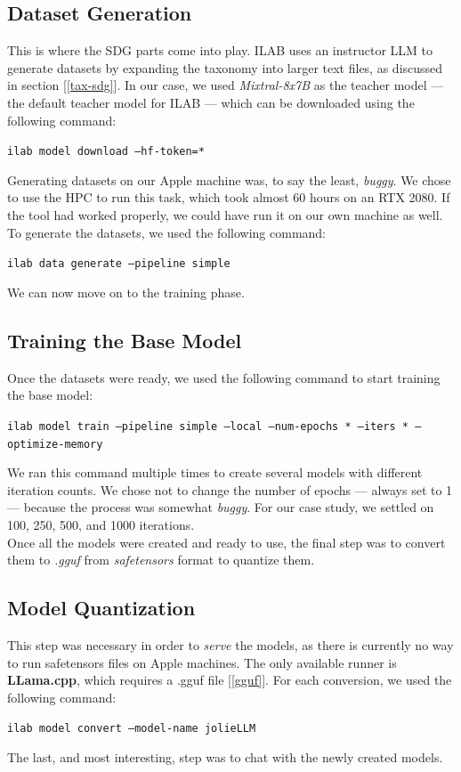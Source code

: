 \documentclass[12pt]{article}
\begin{document}
\subsection{Dataset Generation}
This is where the SDG parts come into play. ILAB uses an instructor LLM to generate datasets by expanding the taxonomy into larger text files, as discussed in section [\ref{tax-sdg}]. In our case, we used \textit{Mixtral-8x7B} as the teacher model — the default teacher model for ILAB — which can be downloaded using the following command:
\begin{center}
    \texttt{ilab model download --hf-token=*}
\end{center}
Generating datasets on our Apple machine was, to say the least, \textit{buggy}. We chose to use the HPC to run this task, which took almost 60 hours on an RTX 2080. If the tool had worked properly, we could have run it on our own machine as well.\\
To generate the datasets, we used the following command:
\begin{center}
    \texttt{ilab data generate --pipeline simple}
\end{center}
We can now move on to the training phase.

\subsection{Training the Base Model}
Once the datasets were ready, we used the following command to start training the base model:
\begin{center}
    \texttt{ilab model train --pipeline simple --local --num-epochs * --iters * --optimize-memory}
\end{center}
We ran this command multiple times to create several models with different iteration counts. We chose not to change the number of epochs — always set to 1 — because the process was somewhat \textit{buggy}. For our case study, we settled on 100, 250, 500, and 1000 iterations.\vspace{14pt}\\
Once all the models were created and ready to use, the final step was to convert them to \textit{.gguf} from \textit{safetensors} format to quantize them.

\subsection{Model Quantization}
This step was necessary in order to \textit{serve} the models, as there is currently no way to run safetensors files on Apple machines. The only available runner is \textbf{LLama.cpp}, which requires a .gguf file [\ref{gguf}]. For each conversion, we used the following command:
\begin{center}
    \texttt{ilab model convert --model-name jolieLLM}
\end{center}
The last, and most interesting, step was to chat with the newly created models.
\end{document}
